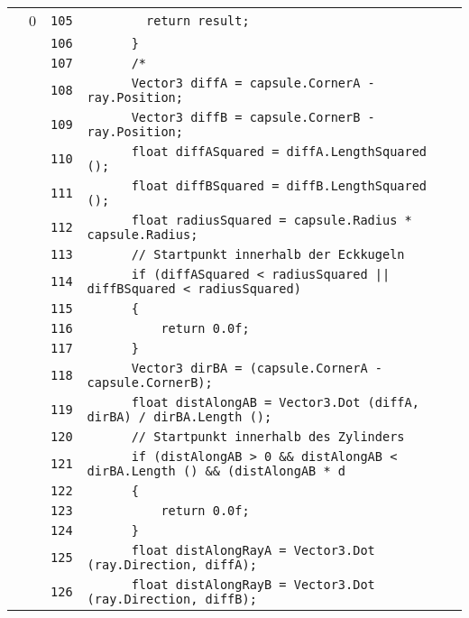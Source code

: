 \documentclass[a4paper,10pt]{article}
\begin{document}
\begin{longtable}[l]{lrrl}
\cellcolor{red} & 0 & \verb~105~ & \verb~        return result;~\\
\cellcolor{gray} &  & \verb~106~ & \verb~      }~\\
\cellcolor{gray} &  & \verb~107~ & \verb~      /*~\\
\cellcolor{gray} &  & \verb~108~ & \verb~      Vector3 diffA = capsule.CornerA - ray.Position;~\\
\cellcolor{gray} &  & \verb~109~ & \verb~      Vector3 diffB = capsule.CornerB - ray.Position;~\\
\cellcolor{gray} &  & \verb~110~ & \verb~      float diffASquared = diffA.LengthSquared ();~\\
\cellcolor{gray} &  & \verb~111~ & \verb~      float diffBSquared = diffB.LengthSquared ();~\\
\cellcolor{gray} &  & \verb~112~ & \verb~      float radiusSquared = capsule.Radius * capsule.Radius;~\\
\cellcolor{gray} &  & \verb~113~ & \verb~      // Startpunkt innerhalb der Eckkugeln~\\
\cellcolor{gray} &  & \verb~114~ & \verb~      if (diffASquared < radiusSquared || diffBSquared < radiusSquared)~\\
\cellcolor{gray} &  & \verb~115~ & \verb~      {~\\
\cellcolor{gray} &  & \verb~116~ & \verb~          return 0.0f;~\\
\cellcolor{gray} &  & \verb~117~ & \verb~      }~\\
\cellcolor{gray} &  & \verb~118~ & \verb~      Vector3 dirBA = (capsule.CornerA - capsule.CornerB);~\\
\cellcolor{gray} &  & \verb~119~ & \verb~      float distAlongAB = Vector3.Dot (diffA, dirBA) / dirBA.Length ();~\\
\cellcolor{gray} &  & \verb~120~ & \verb~      // Startpunkt innerhalb des Zylinders~\\
\cellcolor{gray} &  & \verb~121~ & \verb~      if (distAlongAB > 0 && distAlongAB < dirBA.Length () && (distAlongAB * d~\\
\cellcolor{gray} &  & \verb~122~ & \verb~      {~\\
\cellcolor{gray} &  & \verb~123~ & \verb~          return 0.0f;~\\
\cellcolor{gray} &  & \verb~124~ & \verb~      }~\\
\cellcolor{gray} &  & \verb~125~ & \verb~      float distAlongRayA = Vector3.Dot (ray.Direction, diffA);~\\
\cellcolor{gray} &  & \verb~126~ & \verb~      float distAlongRayB = Vector3.Dot (ray.Direction, diffB);~\\

\end{longtable}
\end{document}
